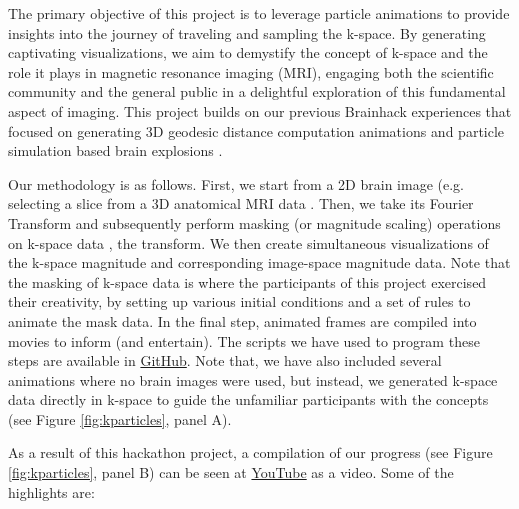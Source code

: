 \documentclass{article}
\begin{document}
The primary objective of this project is to leverage particle animations to provide insights into the journey of traveling and sampling the k-space. By generating captivating visualizations, we aim to demystify the concept of k-space and the role it plays in magnetic resonance imaging (MRI), engaging both the scientific community and the general public in a delightful exploration of this fundamental aspect of imaging. This project builds on our previous Brainhack experiences that focused on generating 3D geodesic distance computation animations \cite{Brainhack2021} and particle simulation based brain explosions \cite{Moia2024}.

Our methodology is as follows. First, we start from a 2D brain image (e.g. selecting a slice from a 3D anatomical MRI data 
\cite{Brett2023-ia,Numpy,Scipy}. Then, we take its Fourier Transform and subsequently perform masking (or magnitude scaling) operations on k-space data \cite{Bernstein2004}, the transform. We then create simultaneous visualizations of the k-space magnitude and corresponding image-space magnitude data. Note that the masking of k-space data is where the participants of this project exercised their creativity, by setting up various initial conditions and a set of rules to animate the mask data. In the final step, animated frames are compiled into movies to inform (and entertain). The scripts we have used to program these steps are available in \href{https://github.com/ofgulban/k_particles}{GitHub}. Note that, we have also included several animations where no brain images were used, but instead, we generated k-space data directly in k-space to guide the unfamiliar participants with the concepts (see Figure \ref{fig:kparticles}, panel A).

As a result of this hackathon project, a compilation of our progress (see Figure \ref{fig:kparticles}, panel B) can be seen at \href{https://youtu.be/_5ZDctWv5X4}{YouTube} as a video. Some of the highlights are:
\end{document}
